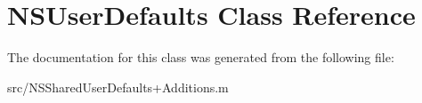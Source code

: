 \hypertarget{class_n_s_user_defaults}{
\section{NSUserDefaults Class Reference}
\label{class_n_s_user_defaults}
}


The documentation for this class was generated from the following file:\begin{DoxyCompactItemize}
\item 
src/NSSharedUserDefaults+Additions.m\end{DoxyCompactItemize}
